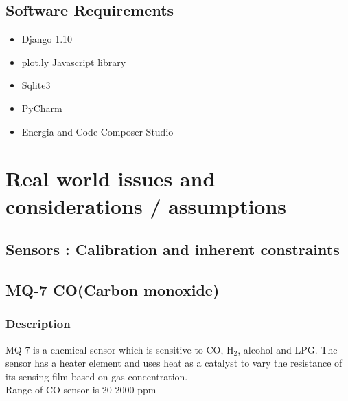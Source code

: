 \documentclass[a4paper,12pt]{article}
\begin{document}
\subsection{Software Requirements}
\begin{itemize}
	\item Django 1.10
    \item plot.ly Javascript library
    \item Sqlite3
    \item PyCharm
    \item Energia and Code Composer Studio
\end{itemize}
\section{Real world issues and considerations / assumptions}
\label{sec: Issues and Calibration}
 
\subsection{Sensors : Calibration and inherent constraints}
\subsection*{MQ-7 CO(Carbon monoxide)}
\subsubsection{Description}
MQ-7 is a chemical sensor which is sensitive to CO, H$_2$, alcohol and LPG. The sensor has a heater element and uses heat as a catalyst to vary the resistance of its sensing film based on gas concentration.
\\
Range of CO sensor is 20-2000 ppm
\end{document}
